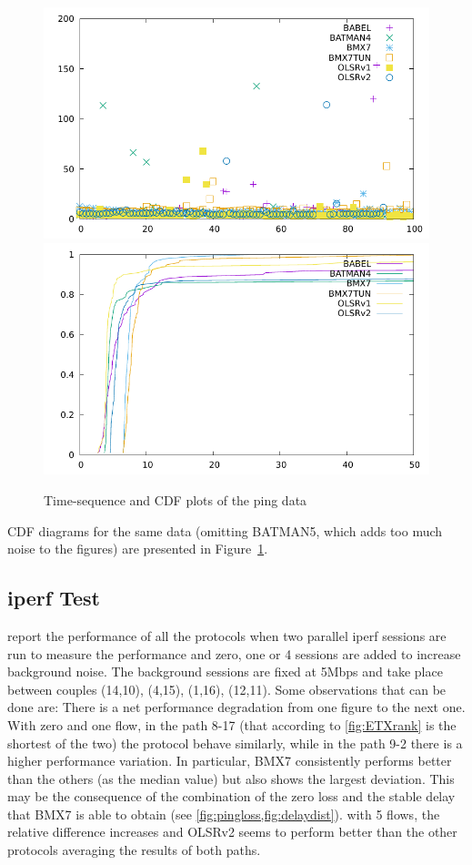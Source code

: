 \documentclass[10pt,onecolumn]{paper}
\begin{document}
\begin{figure}[p]
\includegraphics[width=0.48\linewidth]{images/scatter-failuretest-node9-fc00:2::1.pdf}\hfill%
\includegraphics[width=0.48\linewidth]{images/cdf-failuretest-node9-fc00:2::1.pdf}
\caption{Time-sequence and CDF plots of the ping data}\label{fig:jch}
\end{figure}

CDF diagrams for the same data (omitting BATMAN5, which adds too much
noise to the figures) are presented in Figure~\ref{fig:jch}.

\FloatBarrier
\subsection{iperf Test}
 report the performance
of all the protocols when two parallel iperf sessions are run to measure the
performance and zero, one or 4 sessions are added to increase background noise.
The background sessions are fixed at 5Mbps and take place between couples
(14,10), (4,15), (1,16), (12,11). Some observations that can be done are:
\bi
\ii There is a net performance degradation from one figure to the next one. 
\ii With zero and one flow, in the path 8-17 (that according to \cref{fig:ETXrank}
is the shortest of the two) the protocol behave similarly, while in the path 9-2
there is a higher performance variation. In particular, BMX7 consistently
performs better than the others (as the median value) but also shows the largest
deviation. This may be the consequence of the combination of the zero loss and
the stable delay that BMX7 is able to obtain (see \cref{fig:pingloss,fig:delaydist}).
\ii with 5 flows, the relative difference increases and OLSRv2 seems to perform
better than the other protocols averaging the results of both paths.
\ei
\end{document}
